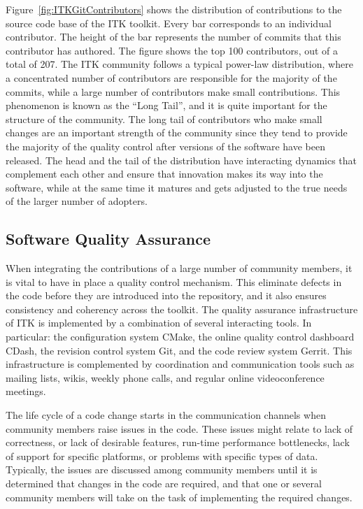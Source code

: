 \documentclass{frontiersENG} %
\begin{document}
Figure~\ref{fig:ITKGitContributors} shows the distribution of contributions
to the source code base of the ITK toolkit. Every bar corresponds to an individual
contributor. The height of the bar represents the number of commits that this
contributor has authored. The figure shows the top 100 contributors, out of a
total of 207. The ITK community follows a typical power-law distribution, where
a concentrated number of contributors are responsible for the majority of the
commits, while a large number of contributors make small contributions.  This
phenomenon is known as the ``Long Tail'', and it is quite important for the
structure of the community. The long tail of contributors who make small
changes are an important strength of the community since they tend to provide
the majority of the quality control after versions of the software have been
released. The head and the tail of the distribution have interacting dynamics
that complement each other and ensure that innovation makes its way into the
software, while at the same time it matures and gets adjusted to the true needs
of the larger number of adopters.



\subsection{Software Quality Assurance}

When integrating the contributions of a large number of community members, it
is vital to have in place a quality control mechanism. This
eliminate defects in the code before they are introduced into the repository, and
it also ensures consistency and coherency across the toolkit.
The quality assurance infrastructure of ITK is implemented by a combination
of several interacting tools. In particular: the configuration system CMake,
the online quality control dashboard CDash, the revision control system Git,
and the code review system Gerrit. This infrastructure is complemented by
coordination and communication tools such as mailing lists, wikis,
weekly phone calls, and regular online videoconference meetings.

The life cycle of a code change starts in the communication channels when
community members raise issues in the code. These issues might relate to lack
of correctness, or lack of desirable features, run-time performance
bottlenecks, lack of support for specific platforms, or
problems with specific types of data. Typically, the issues are discussed among
community members until it is determined that changes in the code are required,
and that one or several community members will take on the task of
implementing the required changes.
\end{document}
